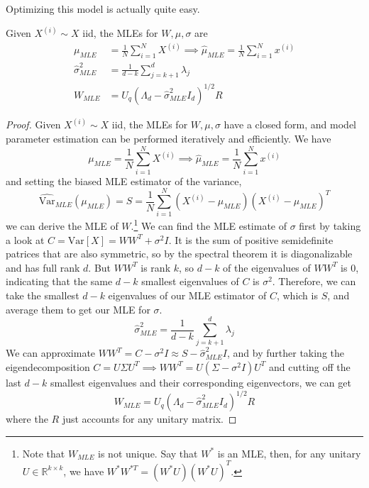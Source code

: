   Optimizing this model is actually quite easy. 

  \begin{theorem}
    Given $X^{(i)} \sim X$ iid, the MLEs for $W, \mu, \sigma$ are 
    \begin{align}
      \mu_{MLE} & = \frac{1}{N} \sum_{i=1}^N X^{(i)} \implies \hat{\mu}_{MLE} = \frac{1}{N} \sum_{i=1}^N x^{(i)} \\ 
      \hat{\sigma}^2_{MLE} & = \frac{1}{d-k} \sum_{j=k+1}^d \lambda_j \\
      W_{MLE} & = U_q (\Lambda_d - \hat{\sigma}_{MLE}^2 I_d )^{1/2} R
    \end{align}
  \end{theorem}
  \begin{proof}
    Given $X^{(i)} \sim X$ iid, the MLEs for $W, \mu, \sigma$ have a closed form, and model parameter estimation can be performed iteratively and efficiently. We have 
    \begin{equation}
      \mu_{MLE} = \frac{1}{N} \sum_{i=1}^N X^{(i)} \implies \hat{\mu}_{MLE} = \frac{1}{N} \sum_{i=1}^N x^{(i)}
    \end{equation}
    and setting the biased MLE estimator of the variance, 
    \begin{equation}
      \widehat{\mathrm{Var}}_{MLE}(\mu_{MLE}) = S = \frac{1}{N} \sum_{i=1}^N (X^{(i)} - \mu_{MLE}) (X^{(i)} - \mu_{MLE})^T
    \end{equation}
    we can derive the MLE of $W$.\footnote{Note that $W_{MLE}$ is not unique. Say that $W^\ast$ is an MLE, then, for any unitary $U \in \mathbb{R}^{k \times k}$, we have $W^\ast W^{\ast T} = (W^\ast U) (W^\ast U)^T$.} We can find the MLE estimate of $\sigma$ first by taking a look at $C = \mathrm{Var}[X] = W W^T + \sigma^2 I$. It is the sum of positive semidefinite patrices that are also symmetric, so by the spectral theorem it is diagonalizable and has full rank $d$. But $W W^T$ is rank $k$, so $d - k$ of the eigenvalues of $W W^T$ is $0$, indicating that the same $d-k$ smallest eigenvalues of $C$ is $\sigma^2$. Therefore, we can take the smallest $d-k$ eigenvalues of our MLE estimator of $C$, which is $S$, and average them to get our MLE for $\sigma$. 
    \begin{equation}
      \hat{\sigma}^2_{MLE} = \frac{1}{d-k} \sum_{j=k+1}^d \lambda_j
    \end{equation}
    We can approximate $W W^T = C - \sigma^2 I \approx S - \hat{\sigma}^2_{MLE} I$, and by further taking the eigendecomposition $C = U \Sigma U^T \implies W W^T = U (\Sigma - \sigma^2 I) U^T$ and cutting off the last $d-k$ smallest eigenvalues and their corresponding eigenvectors, we can get 
    \begin{equation}
      W_{MLE} = U_q (\Lambda_d - \hat{\sigma}_{MLE}^2 I_d )^{1/2} R
    \end{equation}
    where the $R$ just accounts for any unitary matrix. 
  \end{proof}

